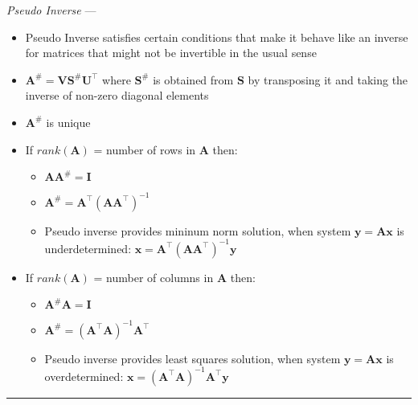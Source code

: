 \emph{Pseudo Inverse} --- 
\begin{itemize}
    \item Pseudo Inverse satisfies certain conditions that make it behave like an inverse for matrices that might not be invertible in the usual sense
    \item $\boldsymbol{A}^{\#} = \boldsymbol{V} \boldsymbol{S}^{\#} \boldsymbol{U}^\intercal$ where $ \boldsymbol{S}^{\#}$ is obtained from $ \boldsymbol{S}$ by transposing it and taking the inverse of non-zero diagonal elements
    \item $\boldsymbol{A}^{\#}$ is unique
    \item If $rank(\boldsymbol{A})$ = number of rows in $\boldsymbol{A}$ then:
    \begin{itemize}
        \item $\boldsymbol{A}\boldsymbol{A}^{\#} = \boldsymbol{I}$
        \item $\boldsymbol{A}^{\#} = \boldsymbol{A}^\intercal (\boldsymbol{A}\boldsymbol{A}^\intercal)^{-1}$
        \item Pseudo inverse provides mininum norm solution, when system $\boldsymbol{y} = \boldsymbol{A}\boldsymbol{x}$ is underdetermined: $\boldsymbol{x} = \boldsymbol{A}^\intercal (\boldsymbol{A}\boldsymbol{A}^\intercal)^{-1} \boldsymbol{y}$
    \end{itemize}
    \item If $rank(\boldsymbol{A})$ = number of columns in $\boldsymbol{A}$ then:
    \begin{itemize}
        \item $\boldsymbol{A}^{\#}\boldsymbol{A} = \boldsymbol{I}$
        \item $\boldsymbol{A}^{\#} =  (\boldsymbol{A}^\intercal\boldsymbol{A})^{-1} \boldsymbol{A}^\intercal$
        \item Pseudo inverse provides least squares solution, when system $\boldsymbol{y} = \boldsymbol{A}\boldsymbol{x}$ is overdetermined: $\boldsymbol{x} = (\boldsymbol{A}^\intercal\boldsymbol{A})^{-1} \boldsymbol{A}^\intercal\boldsymbol{y}$
    \end{itemize}
\end{itemize}

{\color{lightgray}\hrule height 0.001mm}

